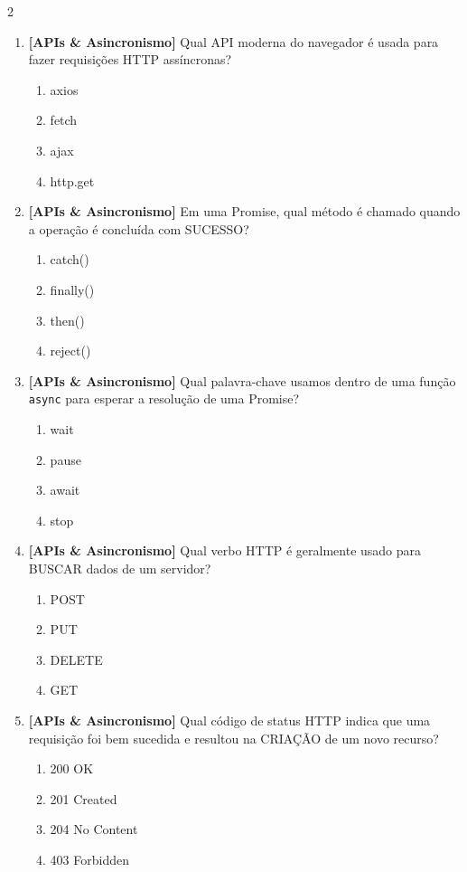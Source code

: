 \documentclass[a4paper,10pt]{article}
\begin{document}
\begin{multicols*}{2}
\begin{enumerate}[label=\textbf{\arabic*.}, resume, leftmargin=*]
\item \textbf{[APIs \& Asincronismo]} Qual API moderna do navegador é usada para fazer requisições HTTP assíncronas?
\begin{enumerate}[label=(\alph*), noitemsep]
  \item axios
  \item fetch
  \item ajax
  \item http.get
\end{enumerate}

\item \textbf{[APIs \& Asincronismo]} Em uma Promise, qual método é chamado quando a operação é concluída com SUCESSO?
\begin{enumerate}[label=(\alph*), noitemsep]
  \item catch()
  \item finally()
  \item then()
  \item reject()
\end{enumerate}

\item \textbf{[APIs \& Asincronismo]} Qual palavra-chave usamos dentro de uma função \texttt{async} para esperar a resolução de uma Promise?
\begin{enumerate}[label=(\alph*), noitemsep]
  \item wait
  \item pause
  \item await
  \item stop
\end{enumerate}

\item \textbf{[APIs \& Asincronismo]} Qual verbo HTTP é geralmente usado para BUSCAR dados de um servidor?
\begin{enumerate}[label=(\alph*), noitemsep]
  \item POST
  \item PUT
  \item DELETE
  \item GET
\end{enumerate}

\item \textbf{[APIs \& Asincronismo]} Qual código de status HTTP indica que uma requisição foi bem sucedida e resultou na CRIAÇÃO de um novo recurso?
\begin{enumerate}[label=(\alph*), noitemsep]
  \item 200 OK
  \item 201 Created
  \item 204 No Content
  \item 403 Forbidden
\end{enumerate}


\end{enumerate}
\end{multicols*}
\end{document}
